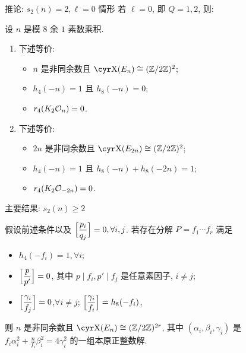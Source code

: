 \documentclass[aspectratio=169,handout]{ctexbeamer}
\renewcommand\aleg[2]{\Bigl[\dfrac{{#1}}{#2}\Bigr]}
\begin{document}
\begin{frame}{推论: $s_2(n)=2,\ell=0$ 情形}
  若 $\ell=0$, 即 $Q=1,2$, 则:
  \begin{corollary}
    设 $n$ 是模 $8$ 余 $1$ 素数乘积.
    \begin{enumerate}
      \item 下述等价:
      \begin{itemize}[<*>]
        \item $n$ 是非同余数且 $\Sha(E_n)\cong(\BZ/2\BZ)^2$;
        \item $h_4(-n)=1$ 且 $h_8(-n)=0$;
        \item $r_4(K_2{\mathcal{O}}_n)=0$.
      \end{itemize}
      \item 下述等价:
      \begin{itemize}[<*>]
        \item $2n$ 是非同余数且 $\Sha(E_{2n})\cong(\BZ/2\BZ)^2$;
        \item $h_4(-n)=1$ 且 $h_8(-n)+h_8(-2n)=1$;
        \item $r_4(K_2{\mathcal{O}}_{-2n})=0$.
      \end{itemize}
    \end{enumerate}
  \end{corollary}
\end{frame}


\begin{frame}{主要结果: $s_2(n)\ge 2$}
  \begin{theorem}
    假设前述条件以及 $\aleg{p_i}{q_j}=0, \forall i,j$.
    若存在分解 $P=f_1\cdots f_r$ 满足
    \begin{itemize}[<*>]
      \item $h_4(-f_i)=1,\forall i$;
      \item $\aleg{p}{p'}=0$, 其中 $p\mid f_i,p'\mid f_j$ 是任意素因子, $i\ne j$;
      \item $\aleg{\gamma_i}{f_j}=0$,$\forall i\ne j$; $\aleg{\gamma_i}{f_i}=h_8(-f_i)$,
    \end{itemize}
    则 $n$ 是非同余数且 $\Sha(E_n)\cong(\BZ/2\BZ)^{2r}$,
    其中 $(\alpha_i,\beta_i,\gamma_i)$ 是  $f_i\alpha_i^2+\frac{n}{f_i}\beta_i^2=4\gamma_i^2$ 的一组本原正整数解.
  \end{theorem}
\end{frame}
\end{document}
